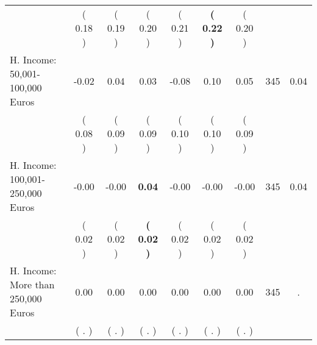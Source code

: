 \begin{tabular}{lcccccccc}
 & (     0.18 ) & (     0.19 ) & (     0.20 ) & (     0.21 ) & \textbf{(     0.22 )} & (     0.20 ) & \\
H. Income: 50,001-100,000 Euros &     -0.02 &      0.04 &      0.03 &     -0.08 &      0.10 &      0.05 & 345 &       0.04 \\ 
 & (     0.08 ) & (     0.09 ) & (     0.09 ) & (     0.10 ) & (     0.10 ) & (     0.09 ) & \\
H. Income: 100,001-250,000 Euros &     -0.00 &     -0.00 & \textbf{     0.04} &     -0.00 &     -0.00 &     -0.00 & 345 &       0.04 \\ 
 & (     0.02 ) & (     0.02 ) & \textbf{(     0.02 )} & (     0.02 ) & (     0.02 ) & (     0.02 ) & \\
H. Income: More than 250,000 Euros &      0.00 &      0.00 &      0.00 &      0.00 &      0.00 &      0.00 & 345 &          . \\ 
 & (        . ) & (        . ) & (        . ) & (        . ) & (        . ) & (        . ) & \\
\bottomrule
\end{tabular}
